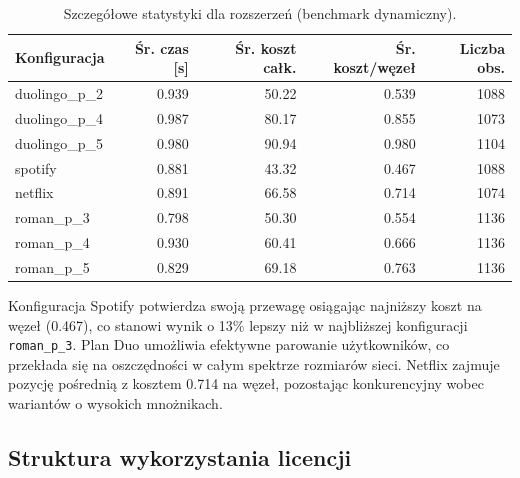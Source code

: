 \begin{table}[H]
  \centering
  \caption{Szczegółowe statystyki dla rozszerzeń (benchmark dynamiczny).}
  \label{tab:ext-dynamic-detailed}
  \begin{tabular}{lrrrr}
    \toprule
    \textbf{Konfiguracja} & \textbf{Śr. czas [s]} & \textbf{Śr. koszt całk.} & \textbf{Śr. koszt/węzeł} & \textbf{Liczba obs.} \\
    \midrule
    duolingo\_p\_2        & 0.939                 & 50.22                    & 0.539                    & 1088                 \\
    duolingo\_p\_4        & 0.987                 & 80.17                    & 0.855                    & 1073                 \\
    duolingo\_p\_5        & 0.980                 & 90.94                    & 0.980                    & 1104                 \\
    spotify               & 0.881                 & 43.32                    & 0.467                    & 1088                 \\
    netflix               & 0.891                 & 66.58                    & 0.714                    & 1074                 \\
    roman\_p\_3           & 0.798                 & 50.30                    & 0.554                    & 1136                 \\
    roman\_p\_4           & 0.930                 & 60.41                    & 0.666                    & 1136                 \\
    roman\_p\_5           & 0.829                 & 69.18                    & 0.763                    & 1136                 \\
    \bottomrule
  \end{tabular}
\end{table}

Konfiguracja Spotify potwierdza swoją przewagę osiągając najniższy koszt na węzeł (0.467), co stanowi wynik o 13\% lepszy niż w najbliższej konfiguracji \texttt{roman\_p\_3}. Plan Duo umożliwia efektywne parowanie użytkowników, co przekłada się na oszczędności w całym spektrze rozmiarów sieci. Netflix zajmuje pozycję pośrednią z kosztem 0.714 na węzeł, pozostając konkurencyjny wobec wariantów o wysokich mnożnikach.

\subsection{Struktura wykorzystania licencji}

